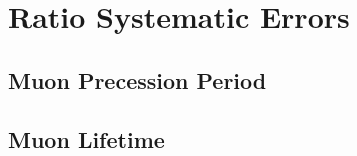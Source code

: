 
\graphicspath{{Body/Figures/Ratio/}}

\section{Ratio Systematic Errors}

\subsection{Muon Precession Period}

\subsection{Muon Lifetime}

